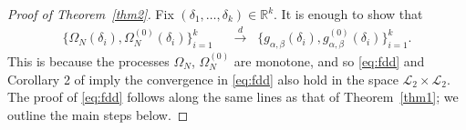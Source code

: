 \documentclass[12pt]{amsart}
\theoremstyle{plain}
\theoremstyle{remark}
\numberwithin{equation}{section}
\begin{document}
\begin{proof}[Proof of Theorem~\ref{thm2}] 
Fix \((\delta_{1},\ldots,\delta_{k}) \in \mathbb{R}^k\). 
It is enough to show that 
\begin{align}\label{eq:fdd}
\{\Omega_{N}(\delta_{i}), \Omega^{(0)}_{N}(\delta_{i})\}_{i=1}^{k} &\;\;\stackrel{d}{\to}\;\; 
\{ g_{\alpha, \beta}(\delta_i), g^{(0)}_{\alpha, \beta}(\delta_i)\}_{i=1}^{k}.
\end{align}
This is because the processes $\Omega_{N}$, $\Omega^{(0)}_{N}$ are monotone, and so \eqref{eq:fdd} and Corollary 2 of \cite{MR1311975} imply 
the convergence in \eqref{eq:fdd} also hold in the space \(\mathcal{L}_{2} \times \mathcal{L}_{2}\). The proof of \eqref{eq:fdd} follows along the same lines as that of Theorem~\ref{thm1}; we outline the main steps below.


\end{proof}
\end{document}
